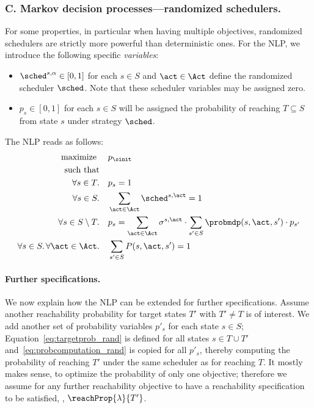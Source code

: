 \subsubsection{C. Markov decision processes---randomized schedulers.}
For some properties, in particular when having multiple objectives, randomized schedulers are strictly more powerful than deterministic ones. For the NLP, we introduce the following specific \emph{variables}:
		\begin{itemize}
			\item $\sched^{s,\alpha}\in[0,1]$ for each $s\in S$ and $\act\in\Act$ define the randomized scheduler $\sched$. Note that these scheduler variables may be assigned zero.
			\item $p_s\in[0,1]$ for each $s\in S$ will be assigned the probability of reaching $T\subseteq S$ from state $s$ under strategy $\sched$.
		\end{itemize}
	 	The NLP reads as follows:
		\begin{align}
			\text{maximize } &\quad p_{\sinit}\label{eq:min_rand}\\
			\text{such that}\\
			\forall s\in T.	 &\quad p_s=1\label{eq:targetprob_rand}\\
			\forall s\in S.	&\quad \sum_{\act\in\Act}\sched^{s,\act}=1\label{eq:welldefined_sched_rand}\\
			\forall s\in S\setminus T.	&\quad p_s=\sum_{\act\in\Act}\sigma^{s,\act}\cdot\sum_{s'\in S}	\probmdp(s,\act,s')\cdot p_{s'}\label{eq:probcomputation_rand}\\
			\forall s\in S.\, \forall\act\in\Act.	 &\quad \sum_{s'\in S}P(s,\act,s')=1\label{eq:well-defined_probs_rand}
		\end{align}
	\paragraph{Further specifications.}
We now explain how the NLP can be extended for further specifications. Assume  another reachability probability for target states $T'$ with $T'\neq T$ is of interest. We add another set of probability variables $p'_s$ for each state $s\in S$; Equation~\eqref{eq:targetprob_rand} is defined for all states $s\in T\cup T'$ and~\eqref{eq:probcomputation_rand} is copied for all $p'_s$, thereby computing the probability of reaching $T'$ under the same scheduler as for reaching $T$. It mostly makes sense, to optimize the probability of only one objective; therefore we assume for any further reachability objective to have a reachability specification to be satisfied, \eg, $\reachProp{\lambda}{T'}$.

